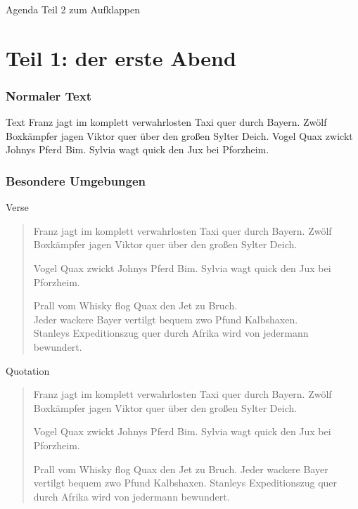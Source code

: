 	\begin{frame}{Agenda Teil 2 zum Aufklappen}
		\tableofcontents[part=2, pausesections]
	\end{frame}





	\part{Teil 1: der erste Abend}

	\frame{\partpage}

	\section{Normaler Text}

	\begin{frame}{Text}
		Franz jagt im komplett verwahrlosten Taxi quer durch Bayern.
		Zwölf Boxkämpfer jagen Viktor quer über den großen Sylter Deich.
		Vogel Quax zwickt Johnys Pferd Bim.
		Sylvia wagt quick den Jux bei Pforzheim.
	\end{frame}

	\section{Besondere Umgebungen}

	\begin{frame}{Verse}
		\begin{verse}
			Franz jagt im komplett verwahrlosten Taxi quer durch Bayern.
			Zwölf Boxkämpfer jagen Viktor quer über den großen Sylter Deich.

			Vogel Quax zwickt Johnys Pferd Bim.
			Sylvia wagt quick den Jux bei Pforzheim.

			Prall vom Whisky flog Quax den Jet zu Bruch.\\
			Jeder wackere Bayer vertilgt bequem zwo Pfund Kalbshaxen.\\
			Stanleys Expeditionszug quer durch Afrika wird von jedermann bewundert.\\
		\end{verse}
	\end{frame}

	\begin{frame}{Quotation}
		\begin{quotation}
			Franz jagt im komplett verwahrlosten Taxi quer durch Bayern.
			Zwölf Boxkämpfer jagen Viktor quer über den großen Sylter Deich.

			Vogel Quax zwickt Johnys Pferd Bim.
			Sylvia wagt quick den Jux bei Pforzheim.

			Prall vom Whisky flog Quax den Jet zu Bruch.
			Jeder wackere Bayer vertilgt bequem zwo Pfund Kalbshaxen.
			Stanleys Expeditionszug quer durch Afrika wird von jedermann bewundert.
		\end{quotation}
	\end{frame}

